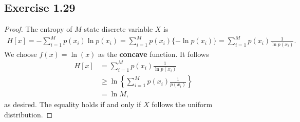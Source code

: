 \documentclass[11pt]{article}
\theoremstyle{definition}
\begin{document}
\subsection{Exercise 1.29}
\begin{proof}
The entropy of $M$-state discrete variable $X$ is 
\begin{align*}
H[x] = -\sum_{i=1}^{M}p(x_i)\ln p(x_i) = \sum_{i=1}^{M}p(x_i)\{-\ln p(x_i)\} = \sum_{i=1}^{M}p(x_i)\frac{1}{\ln p(x_i)}.
\end{align*}
We choose $f(x) = \ln(x)$ as the \textbf{concave} function. It follows
\begin{align*}
H[x] &= \sum_{i=1}^{M}p(x_i)\frac{1}{\ln p(x_i)} \\
& \geq \ln \left\{\sum_{i=1}^{M}p(x_i)\frac{1}{p(x_i)}\right\} \\
&= \ln M,
\end{align*}
as desired. The equality holds if and only if $X$ follows the uniform distribution. 
\end{proof}
\end{document}
